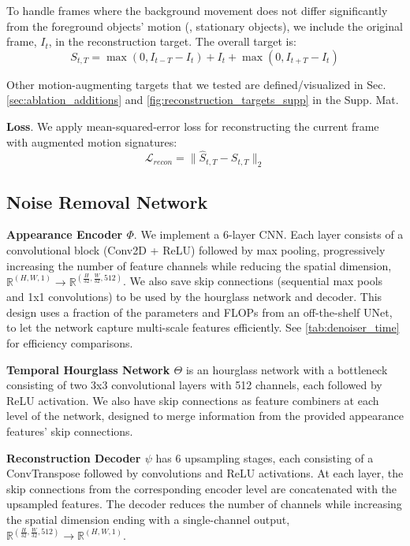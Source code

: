 To handle frames where the background movement does not differ significantly from the foreground objects' motion (\ie, stationary objects), we include the original frame, $I_t$, in the reconstruction target. The overall target is:
\begin{equation}\label{eqn:reconstruction_target}
S_{t,T} = \max(0, I_{t-T} - I_t) + I_t + \max(0, I_{t+T} - I_t)
\end{equation}

Other motion-augmenting targets that we tested are defined/visualized in Sec. \ref{sec:ablation_additions} and \cref{fig:reconstruction_targets_supp} in the Supp. Mat.

\noindent{}\textbf{Loss}. We apply mean-squared-error loss for reconstructing the current frame with augmented motion signatures:
\begin{equation}\label{eqn:recon_loss}
\mathcal{L}_{recon} = \|\hat{S}_{t,T}-S_{t,T}\|_2
\end{equation}



\subsection{Noise Removal Network}\label{sec:method_arch}

\noindent{}\textbf{Appearance Encoder $\Phi$}. We implement a 6-layer CNN. Each layer consists of a convolutional block (Conv2D + ReLU) followed by max pooling, progressively increasing the number of feature channels while reducing the spatial dimension, $\mathbb R^{(H,W,1)} \rightarrow \mathbb R^{(\frac{H}{32},\frac{W}{32}, 512)}$. We also save skip connections (sequential max pools and 1x1 convolutions) to be used by the hourglass network and decoder. This design uses a fraction of the parameters and FLOPs from an off-the-shelf UNet, to let the network capture multi-scale features efficiently. See \cref{tab:denoiser_time} for efficiency comparisons.

\noindent{}\textbf{Temporal Hourglass Network $\Theta$} is an hourglass network with a bottleneck consisting of two 3x3 convolutional layers with 512 channels, each followed by ReLU activation. We also have skip connections as feature combiners at each level of the network, designed to merge information from the provided appearance features' skip connections.

\noindent{}\textbf{Reconstruction Decoder $\psi$} has 6 upsampling stages, each consisting of a ConvTranspose followed by convolutions and ReLU activations. At each layer, the skip connections from the corresponding encoder level are concatenated with the upsampled features. The decoder reduces the number of channels while increasing the spatial dimension ending with a single-channel output, $\mathbb R^{(\frac{H}{32},\frac{W}{32}, 512)} \rightarrow \mathbb R^{(H,W,1)}$.

